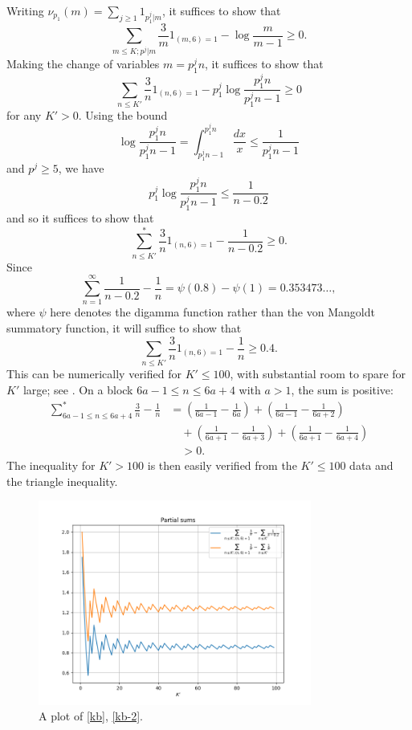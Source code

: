 \documentclass[12pt,a4paper,reqno]{amsart}
\numberwithin{equation}{section}
\theoremstyle{plain}
\theoremstyle{definition}
\begin{document}
Writing $\nu_{p_1}(m) = \sum_{j \geq 1} 1_{p_1^j|m}$, it suffices to show that
  $$ \sum_{m \leq K; p^j|m} \frac{3}{m} 1_{(m,6)=1} - \log \frac{m}{m-1} \geq 0.$$
Making the change of variables $m = p_1^j n$, it suffices to show that
  $$ \sum_{n \leq K'} \frac{3}{n} 1_{(n,6)=1} - p_1^j \log \frac{p_1^j n}{p_1^j n - 1} \geq 0$$
  for any $K' > 0$.   Using the bound
  $$ \log \frac{p_1^jn}{p_1^jn - 1} = \int_{p_1^jn-1}^{p_1^jn} \frac{dx}{x} \leq \frac{1}{p_1^jn-1}$$
  and $p^j \geq 5$, we have
  $$ p_1^j \log \frac{p_1^j n}{p_1^j n - 1} \leq \frac{1}{n-0.2}$$
  and so it suffices to show that
  \begin{equation}\label{kb}
  \sum_{n \leq K'}^* \frac{3}{n} 1_{(n,6)=1} - \frac{1}{n-0.2} \geq 0.
  \end{equation}
  Since 
  $$ \sum_{n=1}^\infty \frac{1}{n-0.2}-\frac{1}{n} = \psi(0.8)-\psi(1) = 0.353473\dots,$$
  where $\psi$ here denotes the digamma function rather than the von Mangoldt summatory function, it will suffice to show that
  \begin{equation}\label{kb-2}
  \sum_{n \leq K'} \frac{3}{n} 1_{(n,6)=1} - \frac{1}{n} \geq 0.4.\end{equation}
  This can be numerically verified for $K' \leq 100$, with substantial room to spare for $K'$ large; see . On a block $6a-1 \leq n \leq 6a+4$ with $a>1$, the sum is positive:
  \begin{align*}
  \sum_{6a-1 \leq n \leq 6a+4}^* \frac{3}{n}  - \frac{1}{n } &= \left(\frac{1}{6a-1} - \frac{1}{6a}\right) + \left(\frac{1}{6a-1} - \frac{1}{6a+2}\right)\\
  &\quad + \left(\frac{1}{6a+1} - \frac{1}{6a+3}\right) + \left(\frac{1}{6a+1} - \frac{1}{6a+4}\right) \\
  &\quad > 0.
  \end{align*}
The inequality for $K'>100$ is then easily verified from the $K' \leq 100$ data and the triangle inequality.
  
  \begin{figure}
  \centering
  \includegraphics[width=0.8\textwidth]{key_ineq.png}
  \vspace{-8pt}
  \caption{A plot of \eqref{kb}, \eqref{kb-2}.}
  \label{fig:kb}
  \end{figure}
\end{document}
